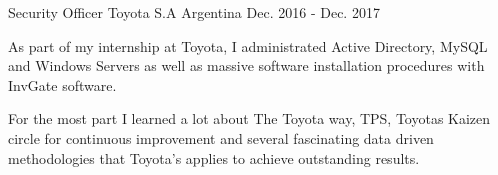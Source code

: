 \begin{cventries}


\cventry
{Security Officer} %
{Toyota S.A} %
{Argentina} %
{Dec. 2016 - Dec. 2017} %
{
\begin{cvitems} %
\item {As part of my internship at Toyota, I administrated Active Directory, MySQL and Windows Servers as well as massive software installation procedures with InvGate software.}
\item {For the most part I learned a lot about The Toyota way, TPS, Toyotas Kaizen circle for continuous improvement and several fascinating data driven methodologies that Toyota's applies to achieve outstanding results.}
\end{cvitems}
}
\end{cventries}
